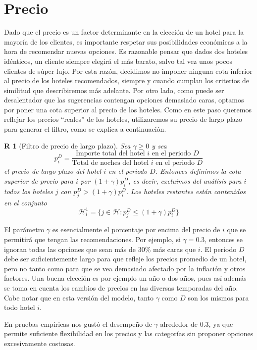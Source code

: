 \documentclass[12pt]{report}
\newcommand{\HH}{\mathcal{H}}
\newtheorem{regla}{R}%
\begin{document}
\section{Precio}

Dado que el precio es un factor determinante en la elección de un hotel para la mayoría de los clientes, es importante respetar sus posibilidades económicas a la hora de recomendar nuevas opciones. Es razonable pensar que dados dos hoteles idénticos, un cliente siempre elegirá el más barato, salvo tal vez unos pocos clientes de súper lujo. Por esta razón, decidimos no imponer ninguna cota inferior al precio de los hoteles recomendados, siempre y cuando cumplan los criterios de similitud que describiremos más adelante. Por otro lado, como puede ser desalentador que las sugerencias contengan opciones demasiado caras, optamos por poner una cota superior al precio de los hoteles. Como en este paso queremos reflejar los precios ``reales'' de los hoteles, utilizaremos su precio de largo plazo para generar el filtro, como se explica a continuación.
\begin{regla}[Filtro de precio de largo plazo] \label{r:preciolargo}
Sea $\gamma \geq 0$ y sea
\[
p^D_i = \frac{\text{Importe total del hotel $i$ en el periodo $D$}}{\text{Total de noches del hotel $i$ en el periodo $D$}}
\]
el precio de largo plazo del hotel $i$ en el periodo $D$. Entonces definimos la cota superior de precio para $i$ por $(1 + \gamma)p^D_i$, es decir, excluimos del análisis para $i$ todos los hoteles $j$ con $p^D_j > (1 + \gamma)p^D_i$. Los hoteles restantes están contenidos en el conjunto
\[
\HH_i^1 = \{j \in \HH : p^D_j \leq (1 + \gamma)p^D_i\}
\]
\end{regla}
El parámetro $\gamma$ es esencialmente el porcentaje por encima del precio de $i$ que se permitirá que tengan las recomendaciones. Por ejemplo, si $\gamma = 0.3$, entonces se ignoran todas las opciones que sean más de 30\% más caras que $i$. El periodo $D$ debe ser suficientemente largo para que refleje los precios promedio de un hotel, pero no tanto como para que se vea demasiado afectado por la inflación y otros factores. Una buena elección es por ejemplo un año o dos años, pues así además se toma en cuenta los cambios de precios en las diversas temporadas del año. Cabe notar que en esta versión del modelo, tanto $\gamma$ como $D$ son los mismos para todo hotel $i$.

En pruebas empíricas nos gustó el desempeño de $\gamma$ alrededor de 0.3, ya que permite suficiente flexibilidad en los precios y las categorías sin proponer opciones excesivamente costosas.
\end{document}
